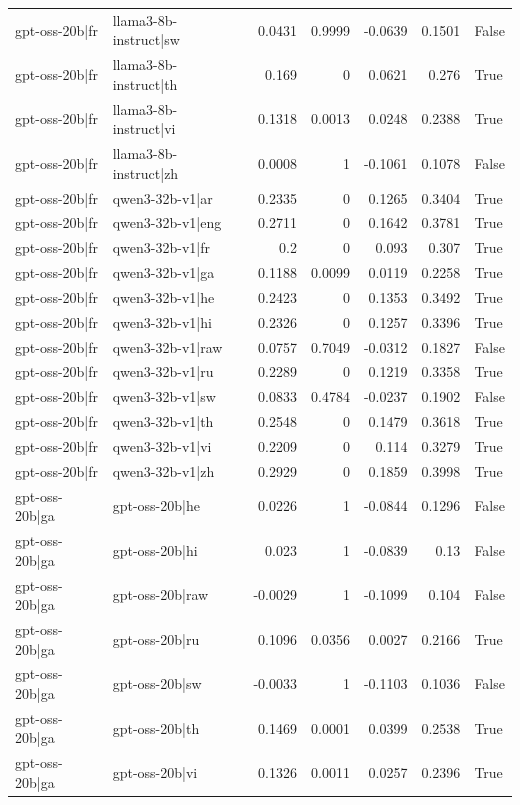 \begin{table}
\begin{tabular}{l l r r r r l}
gpt-oss-20b|fr & llama3-8b-instruct|sw & 0.0431 & 0.9999 & -0.0639 & 0.1501 & False \\
gpt-oss-20b|fr & llama3-8b-instruct|th & 0.169 & 0 & 0.0621 & 0.276 & True \\
gpt-oss-20b|fr & llama3-8b-instruct|vi & 0.1318 & 0.0013 & 0.0248 & 0.2388 & True \\
gpt-oss-20b|fr & llama3-8b-instruct|zh & 0.0008 & 1 & -0.1061 & 0.1078 & False \\
gpt-oss-20b|fr & qwen3-32b-v1|ar & 0.2335 & 0 & 0.1265 & 0.3404 & True \\
gpt-oss-20b|fr & qwen3-32b-v1|eng & 0.2711 & 0 & 0.1642 & 0.3781 & True \\
gpt-oss-20b|fr & qwen3-32b-v1|fr & 0.2 & 0 & 0.093 & 0.307 & True \\
gpt-oss-20b|fr & qwen3-32b-v1|ga & 0.1188 & 0.0099 & 0.0119 & 0.2258 & True \\
gpt-oss-20b|fr & qwen3-32b-v1|he & 0.2423 & 0 & 0.1353 & 0.3492 & True \\
gpt-oss-20b|fr & qwen3-32b-v1|hi & 0.2326 & 0 & 0.1257 & 0.3396 & True \\
gpt-oss-20b|fr & qwen3-32b-v1|raw & 0.0757 & 0.7049 & -0.0312 & 0.1827 & False \\
gpt-oss-20b|fr & qwen3-32b-v1|ru & 0.2289 & 0 & 0.1219 & 0.3358 & True \\
gpt-oss-20b|fr & qwen3-32b-v1|sw & 0.0833 & 0.4784 & -0.0237 & 0.1902 & False \\
gpt-oss-20b|fr & qwen3-32b-v1|th & 0.2548 & 0 & 0.1479 & 0.3618 & True \\
gpt-oss-20b|fr & qwen3-32b-v1|vi & 0.2209 & 0 & 0.114 & 0.3279 & True \\
gpt-oss-20b|fr & qwen3-32b-v1|zh & 0.2929 & 0 & 0.1859 & 0.3998 & True \\
gpt-oss-20b|ga & gpt-oss-20b|he & 0.0226 & 1 & -0.0844 & 0.1296 & False \\
gpt-oss-20b|ga & gpt-oss-20b|hi & 0.023 & 1 & -0.0839 & 0.13 & False \\
gpt-oss-20b|ga & gpt-oss-20b|raw & -0.0029 & 1 & -0.1099 & 0.104 & False \\
gpt-oss-20b|ga & gpt-oss-20b|ru & 0.1096 & 0.0356 & 0.0027 & 0.2166 & True \\
gpt-oss-20b|ga & gpt-oss-20b|sw & -0.0033 & 1 & -0.1103 & 0.1036 & False \\
gpt-oss-20b|ga & gpt-oss-20b|th & 0.1469 & 0.0001 & 0.0399 & 0.2538 & True \\
gpt-oss-20b|ga & gpt-oss-20b|vi & 0.1326 & 0.0011 & 0.0257 & 0.2396 & True \\

\end{tabular}
\end{table}
